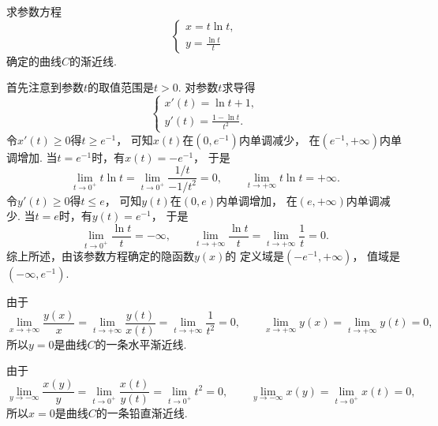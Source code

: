 \begin{example}
求参数方程\begin{equation*}
	\left\{ \begin{array}{l}
		x = t \ln t, \\
		y = \frac{\ln t}t
	\end{array} \right.
\end{equation*}确定的曲线\(C\)的渐近线.
\begin{solution}
首先注意到参数\(t\)的取值范围是\(t>0\).
对参数\(t\)求导得\begin{equation*}
	\left\{ \begin{array}{l}
		x'(t) = \ln t + 1, \\
		y'(t) = \frac{1-\ln t}{t^2}.
	\end{array} \right.
\end{equation*}
令\(x'(t) \geq 0\)得\(t \geq e^{-1}\)，
可知\(x(t)\)在\((0,e^{-1})\)内单调减少，
在\((e^{-1},+\infty)\)内单调增加.
当\(t = e^{-1}\)时，有\(x(t) = -e^{-1}\)，
于是\begin{equation*}
	\lim_{t\to0^+} t \ln t
	= \lim_{t\to0^+} \frac{1/t}{-1/t^2}
	= 0,
	\qquad
	\lim_{t\to+\infty} t \ln t
	= +\infty.
\end{equation*}
令\(y'(t) \geq 0\)得\(t \leq e\)，
可知\(y(t)\)在\((0,e)\)内单调增加，
在\((e,+\infty)\)内单调减少.
当\(t = e\)时，有\(y(t) = e^{-1}\)，
于是\begin{equation*}
	\lim_{t\to0^+} \frac{\ln t}{t}
	= -\infty,
	\qquad
	\lim_{t\to+\infty} \frac{\ln t}{t}
	= \lim_{t\to+\infty} \frac1t
	= 0.
\end{equation*}
综上所述，由该参数方程确定的隐函数\(y(x)\)的
定义域是\((-e^{-1},+\infty)\)，
值域是\((-\infty,e^{-1})\).

由于\begin{equation*}
	\lim_{x\to+\infty} \frac{y(x)}{x}
	= \lim_{t\to+\infty} \frac{y(t)}{x(t)}
	= \lim_{t\to+\infty} \frac1{t^2}
	= 0,
	\qquad
	\lim_{x\to+\infty} y(x)
	= \lim_{t\to+\infty} y(t)
	= 0,
\end{equation*}
所以\(y=0\)是曲线\(C\)的一条水平渐近线.

由于\begin{equation*}
	\lim_{y\to-\infty} \frac{x(y)}{y}
	= \lim_{t\to0^+} \frac{x(t)}{y(t)}
	= \lim_{t\to0^+} t^2
	= 0,
	\qquad
	\lim_{y\to-\infty} x(y)
	= \lim_{t\to0^+} x(t)
	= 0,
\end{equation*}
所以\(x=0\)是曲线\(C\)的一条铅直渐近线.
\end{solution}
\end{example}

